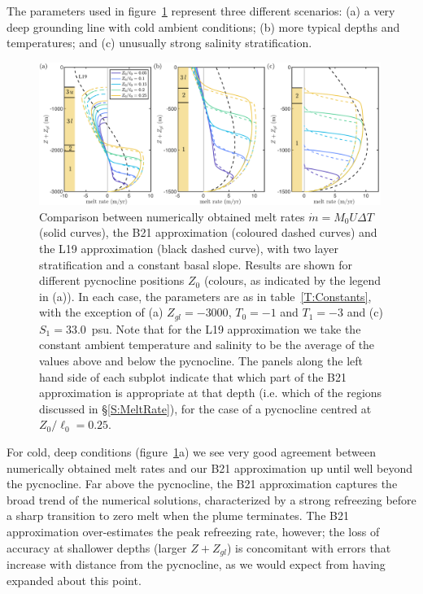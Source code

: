 \documentclass{jfm}
\begin{document}
The parameters used in figure~\ref{fig:Numerics:PycnoclinePosition} represent three different scenarios: (a) a very deep grounding line with cold ambient conditions; (b) more typical depths and temperatures; and (c) unusually strong salinity stratification.

\begin{figure}
\centering
\includegraphics[width = 0.99\textwidth]{fig7_isolating_stratificationAll}
\caption{Comparison between numerically obtained melt rates $\dot{m}= M_0 U \Delta T$ (solid curves), the B21 approximation (coloured dashed curves) and the L19 approximation (black dashed curve), with two layer stratification and a constant basal slope. Results are shown for different pycnocline positions $Z_0$ (colours, as indicated by the legend in (a)). In each case, the parameters are as in table~\ref{T:Constants}, with the exception of (a) $Z_{gl} = -3000$, $T_0 = -1$ and $T_1 = -3$ and (c)  $S_1 = 33.0$~psu. Note that for the L19 approximation we take the constant ambient temperature and salinity to be the average of the values above and below the pycnocline. The panels along the left hand side of each subplot indicate that which part of the B21 approximation is appropriate at that depth (i.e. which of the regions discussed in \S\ref{S:MeltRate}), for the case of a pycnocline centred at $Z_0/\ell_0 = 0.25$.}\label{fig:Numerics:PycnoclinePosition}
\end{figure}

For cold, deep conditions (figure~\ref{fig:Numerics:PycnoclinePosition}a) we see very good agreement between numerically obtained melt rates and our B21 approximation up until well beyond the pycnocline. Far above the pycnocline,  the B21 approximation captures the broad trend of the numerical solutions, characterized by a strong refreezing before a sharp transition to zero melt when the plume terminates. The B21 approximation over-estimates the peak refreezing rate, however; the loss of accuracy at shallower depths (larger $Z + Z_{gl}$) is concomitant with errors that increase with distance from the pycnocline, as we would expect from having expanded about this point.
\end{document}
